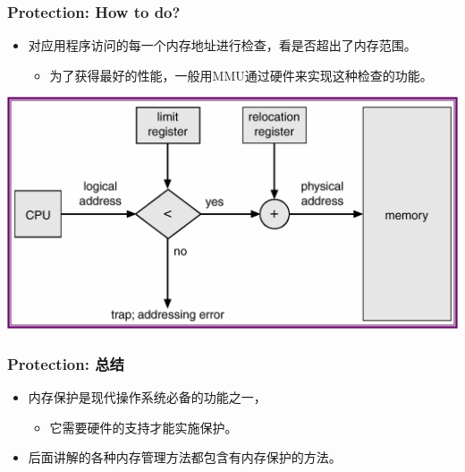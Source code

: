 \documentclass[CJKutf8,xcolor=pdftex,dvipsnames,table]{beamer}
\begin{document}
\begin{CJK*}{UTF8}{song}
  \begin{frame}
  \frametitle{Protection: How to do?}
  \begin{itemize}
  \item{对应用程序访问的每一个内存地址进行检查，看是否超出了内存范围。} \pause
    \begin{itemize}
    \item{为了获得最好的性能，一般用MMU通过硬件来实现这种检查的功能。} \pause
    \end{itemize}
  \end{itemize}
  \begin{center}
    \includegraphics[scale=0.5]{v6f9-5}
  \end{center}
  \end{frame}
  
  \begin{frame}
  \frametitle{Protection: 总结} \pause
  \begin{itemize}
  \item{内存保护是现代操作系统必备的功能之一，} \pause
    \begin{itemize}
    \item{它需要硬件的支持才能实施保护。} \pause
    \end{itemize}
  \item{后面讲解的各种内存管理方法都包含有内存保护的方法。}
  \end{itemize}
  \end{frame}
  

\end{CJK*}
\end{document}
